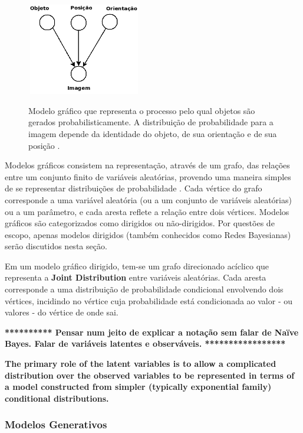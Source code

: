 \begin{figure}[t]
  \centering %
  \includegraphics[width=5cm, height=4cm]{generative-bishop.png}\\
  \caption{Modelo gráfico que representa o processo pelo qual objetos são gerados probabilisticamente. A distribuição de probabilidade para a imagem depende da identidade do objeto, de sua orientação e de sua posição \cite{bishop}.}
  \label{fig:generative-bishop}
\end{figure}

Modelos gráficos consistem na representação, através de um grafo, das relações entre um conjunto finito de variáveis aleatórias, provendo uma maneira simples de se representar distribuições de probabilidade \cite{bishop}. Cada vértice do grafo corresponde a uma variável aleatória (ou a um conjunto de variáveis aleatórias) ou a um parâmetro, e cada aresta reflete a relação entre dois vértices. Modelos gráficos são categorizados como dirigidos ou não-dirigidos. Por questões de escopo, apenas modelos dirigidos (também conhecidos como Redes Bayesianas) serão discutidos nesta seção.

Em um modelo gráfico dirigido, tem-se um grafo direcionado acíclico que representa a \textbf{Joint Distribution} entre variáveis aleatórias. Cada aresta corresponde a uma distribuição de probabilidade condicional envolvendo dois vértices, incidindo no vértice cuja probabilidade está condicionada ao valor - ou valores - do vértice de onde sai. 

\textbf{********** Pensar num jeito de explicar a notação sem falar de Naïve Bayes. Falar de variáveis latentes e observáveis. *****************}

\textbf{                                                                                The
primary role of the latent variables is to allow a complicated distribution over the
observed variables to be represented in terms of a model constructed from simpler
(typically exponential family) conditional distributions.}

\subsubsection{Modelos Generativos} 

